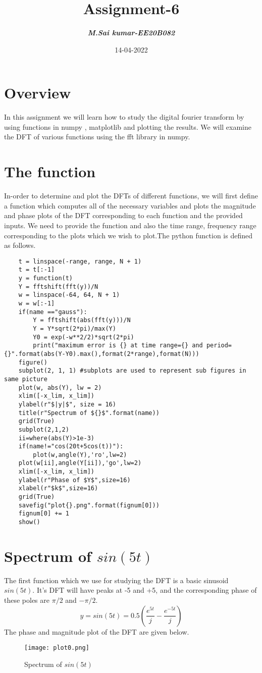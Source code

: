 \documentclass{article}
\title{\textbf{Assignment-6}} %
\author{\textbf{\textit{M.Sai kumar-EE20B082}}} %
\date{14-04-2022}%
\begin{document}
\maketitle

\section{Overview}
In this assignment we will learn how to study the digital fourier transform by using functions in numpy , matplotlib and plotting the results. We will examine the DFT of various functions using the fft library in numpy.

\section{The function}
In-order to determine and plot the DFTs of different functions, we will first define a function which computes all of the necessary variables and plots the magnitude and phase plots of the DFT corresponding to each function and the provided inputs. We need to provide the function and also the time range, frequency range corresponding to the plots which we wish to plot.The python function is defined as follows.
\begin{verbatim}
    t = linspace(-range, range, N + 1)
    t = t[:-1]
    y = function(t)
    Y = fftshift(fft(y))/N
    w = linspace(-64, 64, N + 1) 
    w = w[:-1]
    if(name =="gauss"): 
        Y = fftshift(abs(fft(y)))/N
        Y = Y*sqrt(2*pi)/max(Y)
        Y0 = exp(-w**2/2)*sqrt(2*pi)
        print("maximum error is {} at time range={} and period={}".format(abs(Y-Y0).max(),format(2*range),format(N)))
    figure()
    subplot(2, 1, 1) #subplots are used to represent sub figures in same picture
    plot(w, abs(Y), lw = 2)
    xlim([-x_lim, x_lim])
    ylabel(r"$|y|$", size = 16)
    title(r"Spectrum of ${}$".format(name))
    grid(True)
    subplot(2,1,2)
    ii=where(abs(Y)>1e-3)
    if(name!="cos(20t+5cos(t))"):
        plot(w,angle(Y),'ro',lw=2)
    plot(w[ii],angle(Y[ii]),'go',lw=2)
    xlim([-x_lim, x_lim])
    ylabel(r"Phase of $Y$",size=16)
    xlabel(r"$k$",size=16)
    grid(True)
    savefig("plot{}.png".format(fignum[0]))
    fignum[0] += 1
    show()
\end{verbatim}

\section{Spectrum of $sin(5t)$}
The first function which we use for studying the DFT is a basic sinusoid $sin(5t)$. It's DFT will have peaks at -5 and +5, and the corresponding phase of these poles are $\pi/2$ and $-\pi/2$.
\begin{equation}
y = sin(5t) = 0.5(\frac{e^{5t}}{j}-\frac{e^{-5t}}{j})
\end{equation}
The phase and magnitude plot of the DFT are given below.
\begin{figure}[H]
\centering
\texttt{[image: plot0.png]}
\caption{Spectrum of $sin(5t)$}
\label{fig:fig1}
\end{figure}
\end{document}
